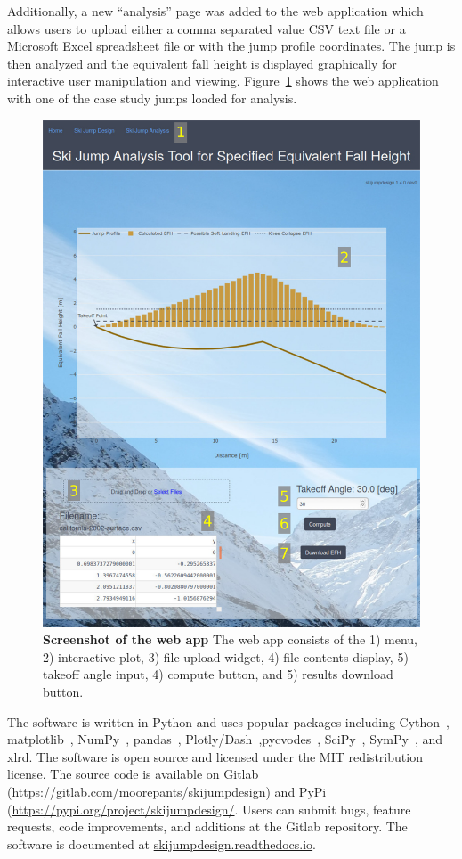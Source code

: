 \documentclass{article}
\begin{document}
Additionally, a new
``analysis'' page was added to the web application which allows users to upload
either a comma separated value CSV text file or a Microsoft Excel spreadsheet
file or with the jump profile coordinates. The jump is then analyzed and the
equivalent fall height is displayed graphically for interactive user
manipulation and viewing. Figure~\ref{fig:web-app-screenshot} shows the web
application with one of the case study jumps loaded for analysis.
%
\begin{figure}
  \centering
  \includegraphics[width=5.00in]{figures/web-app-screenshot.png}
  \caption{\textbf{Screenshot of the web app} The web app consists of the 1)
    menu, 2) interactive plot, 3) file upload widget, 4) file contents display,
    5) takeoff angle input, 4) compute button, and 5) results download button.}
  \label{fig:web-app-screenshot}
\end{figure}

The software is written in Python and uses popular packages including
Cython~\cite{Behnel2011}, matplotlib~\cite{Hunter2007},
NumPy~\cite{Oliphant2006}, pandas~\cite{McKinney2020},
Plotly/Dash~\cite{Plotly2015},pycvodes~\cite{Dahlgren2018},
SciPy~\cite{Virtanen2020}, SymPy~\cite{Meurer2017}, and xlrd.
The software is open source and licensed under the MIT redistribution license.
The source code is available on Gitlab
(\url{https://gitlab.com/moorepants/skijumpdesign}) and PyPi
(\url{https://pypi.org/project/skijumpdesign/}. Users can submit bugs, feature
requests, code improvements, and additions at the Gitlab repository.  The
software is documented at \href{https://skijumpdesign.readthedocs.io}{skijumpdesign.readthedocs.io}.
\end{document}
